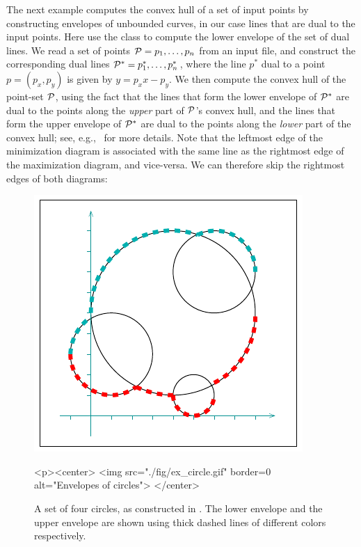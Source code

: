 The next example computes the convex hull of a set of input points
by constructing envelopes of unbounded curves, in our case lines
that are dual to the input points. Here use the
 class to compute the lower envelope of the
set of dual lines. We read a set of points ${\cal P} = p_1, \ldots, p_n$
from an input file, and construct the corresponding dual lines
${\cal P}^{*} = p^{*}_1, \ldots, p^{*}_n$, where the line $p^{*}$ dual
to a point $p = (p_x, p_y)$ is given by $y = p_x x - p_y$. We then
compute the convex hull of the point-set ${\cal P}$, using the fact that
the lines that form the lower envelope of ${\cal P}^{*}$ are dual to the
points along the {\em upper} part of ${\cal P}$'s convex hull, and the
lines that form the upper envelope of ${\cal P}^{*}$ are dual to the
points along the {\em lower} part of the convex hull; see,
e.g.,~\cite[Section~11.4]{bkos-cgaa-00} for more details.
Note that the leftmost edge of the minimization diagram is associated
with the same line as the rightmost edge of the maximization diagram,
and vice-versa. We can therefore skip the rightmost edges of both
diagrams:


\begin{figure}[t]
\begin{ccTexOnly}
  \begin{center}
    \includegraphics{Envelope_2/fig/ex_circle}
  \end{center}
\end{ccTexOnly}
\begin{ccHtmlOnly}
  <p><center>
  <img src="./fig/ex_circle.gif" border=0 alt="Envelopes of circles">
  </center>
\end{ccHtmlOnly}
\caption{A set of four circles, as constructed in
. The lower envelope and the upper
envelope are shown using thick dashed lines of different colors
respectively.\label{env2_fig:ex_circ}}
\end{figure}

